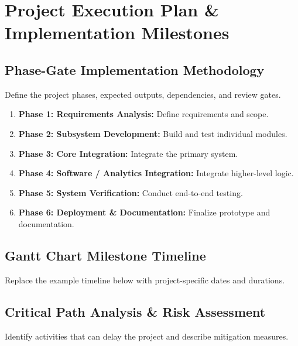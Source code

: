 
\section{Project Execution Plan \& Implementation Milestones}

\subsection{Phase-Gate Implementation Methodology}

Define the project phases, expected outputs, dependencies, and review gates.

\begin{enumerate}
    \item \textbf{Phase 1: Requirements Analysis:} Define requirements and scope.
    \item \textbf{Phase 2: Subsystem Development:} Build and test individual modules.
    \item \textbf{Phase 3: Core Integration:} Integrate the primary system.
    \item \textbf{Phase 4: Software / Analytics Integration:} Integrate higher-level logic.
    \item \textbf{Phase 5: System Verification:} Conduct end-to-end testing.
    \item \textbf{Phase 6: Deployment \& Documentation:} Finalize prototype and documentation.
\end{enumerate}

\subsection{Gantt Chart Milestone Timeline}

Replace the example timeline below with project-specific dates and durations.

\subsection{Critical Path Analysis \& Risk Assessment}

Identify activities that can delay the project and describe mitigation measures.

